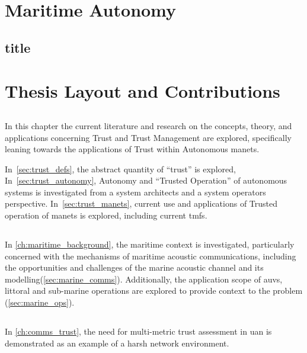 \section{Maritime Autonomy}

\subsection{title}

\section{Thesis Layout and Contributions}

\subsection{}
In this chapter the current literature and research on the concepts, theory, and applications concerning Trust and Trust Management are explored, specifically leaning towards the applications of Trust within Autonomous \glspl{manet}.

In~\autoref{sec:trust_defs}, the abstract quantity of ``trust'' is explored,
In~\autoref{sec:trust_autonomy}, Autonomy and ``Trusted Operation'' of autonomous systems is investigated from a system architects and a system operators perspective.
In~\autoref{sec:trust_manets}, current use and applications of Trusted operation of \glspl{manet} is explored, including current \glspl{tmf}.

\subsection{}
In \autoref{ch:maritime_background}, the maritime context is investigated, particularly concerned with the mechanisms of maritime acoustic communications, including the opportunities and challenges of the marine acoustic channel and its modelling(\autoref{sec:marine_comms}).
Additionally, the application scope of \glspl{auv}, littoral and sub-marine operations are explored to provide context to the problem (\autoref{sec:marine_ops}).

\subsection{}
In \autoref{ch:comms_trust}, the need for multi-metric trust assessment in \gls{uan} is demonstrated as an example of a harsh network environment.

